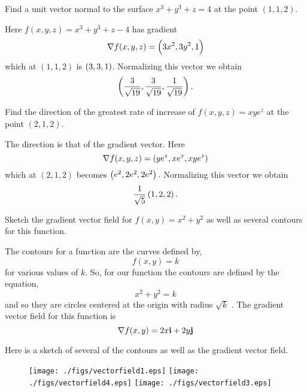 \begin{exa}
Find a unit vector  normal to the surface $x^3 + y^3 + z = 4$ at
the point $(1, 1, 2)$.
\end{exa}
\begin{solu} Here $ f(x, y, z) = x^3 + y^3 + z - 4$ has gradient
$$\nabla f(x,y,z) = \left( 3x^2 ,3y^2 ,1 \right)$$which at $(1, 1,
2)$ is $\left( 3 ,3 ,1 \right)$. Normalizing this vector we obtain
$$\left( \dfrac{3}{\sqrt{19}} ,\dfrac{3}{\sqrt{19}} ,\dfrac{1}{\sqrt{19}} \right).$$


\end{solu}
\begin{exa}
Find the direction of the greatest rate of increase of $ f(x, y, z)
= xye^z$ at the point $(2, 1, 2)$.
\end{exa}
\begin{solu}  The direction is that of the gradient vector. Here
$$\nabla f(x,y,z) = \left( ye^z ,xe^z ,xye^z \right)$$which at
$(2, 1, 2)$ becomes $\left( e^2 ,2e^2 ,2e^2 \right).$ Normalizing
this vector we obtain
$$\dfrac{1}{\sqrt{5}}\left( 1 ,2 ,2 \right).$$
\end{solu}

\begin{exa}
 Sketch the gradient vector field for $f(x,y)=x^2+y^2$ as well as several contours for this function.
\end{exa}

\begin{solu}
The contours for a function are the curves defined by,
\[f(x,y)=k  \]                                                           
for various values of $k$.  So, for our function the contours are defined by the equation,
\[x^2+y^2=k\]
and so they are circles centered at the origin with radius $\sqrt{k}$ .
The gradient vector field for this function is
\[\nabla f(x,y)=2x\mathbf{ i}+2y\mathbf{ j}\]
                                                     
Here is a sketch of several of the contours as well as the gradient vector field.
\end{solu}

\begin{figure}[h]
\begin{center}
 \texttt{[image: ./figs/vectorfield1.eps]}
  \texttt{[image: ./figs/vectorfield4.eps]}
   \texttt{[image: ./figs/vectorfield3.eps]}
\end{center}

 
\end{figure}





